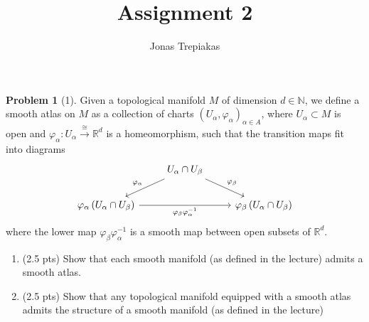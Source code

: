 \documentclass[reqno]{amsart}
\title{Assignment 2}
\author{Jonas Trepiakas}
\date{}
\theoremstyle{definition}
\newtheorem{problem}[theorem]{Problem}
\theoremstyle{remark}
\begin{document}
\maketitle
    \begin{problem}[1]
        Given a topological manifold $M$ of dimension
        $d \in \mathbb{N} $, we define a smooth
        atlas on $M$ as a collection of charts
        $\left( U_{\alpha}, \varphi_{\alpha} \right)_{\alpha
        \in A}$, where $U_{\alpha} \subset M$ is open
        and $\varphi_{\alpha} \colon U_{\alpha}
        \stackrel{\cong}{\to }\mathbb{R}^{d}$ is a homeomorphism,
        such that the transition maps fit into diagrams
        \begin{equation*}
        \begin{tikzcd}
           &  U_{\alpha}\cap U_{\beta} 
            \ar[dl, "\varphi_{\alpha}"'] \ar[dr, "
            \varphi_{\beta}"]& \\
           \varphi_{\alpha}\left( U_{\alpha}\cap U_{\beta} \right) 
            \ar[rr,"\varphi_{\beta} \varphi_{\alpha}^{-1}"'] &&
            \varphi_{\beta} \left( U_{\alpha} \cap
            U_{\beta} \right) 
        \end{tikzcd}
        \end{equation*}
        where the lower map $\varphi_{\beta}\varphi_{\alpha}^{-1}$ 
        is a smooth map between open subsets
        of $\mathbb{R}^{d}$.
        \begin{enumerate}
            \item (2.5 pts) Show that each smooth manifold (as defined in the
                lecture) admits a smooth atlas.
            \item (2.5 pts) Show that any topological manifold equipped
                with a smooth atlas admits the structure of a
                smooth manifold (as defined in the
                lecture)
        \end{enumerate}
    \end{problem}
\end{document}
